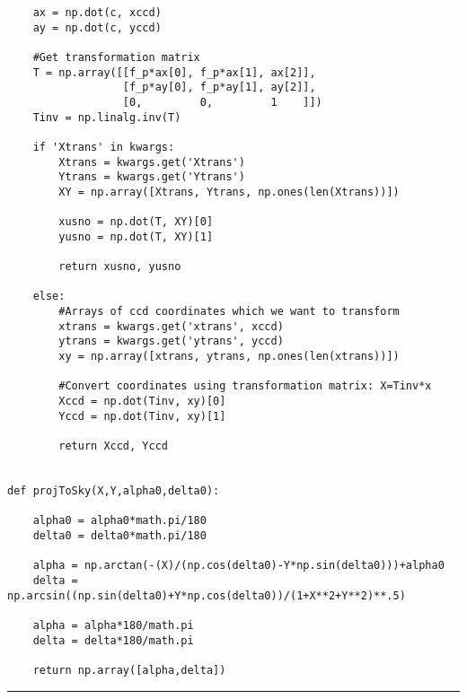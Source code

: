 \documentclass[preprint]{aastex62}
\begin{document}
\begin{lstlisting}
    ax = np.dot(c, xccd)
    ay = np.dot(c, yccd)

    #Get transformation matrix
    T = np.array([[f_p*ax[0], f_p*ax[1], ax[2]],
                  [f_p*ay[0], f_p*ay[1], ay[2]],
                  [0,         0,         1    ]])
    Tinv = np.linalg.inv(T)

    if 'Xtrans' in kwargs:
        Xtrans = kwargs.get('Xtrans')
        Ytrans = kwargs.get('Ytrans')
        XY = np.array([Xtrans, Ytrans, np.ones(len(Xtrans))])

        xusno = np.dot(T, XY)[0]
        yusno = np.dot(T, XY)[1]

        return xusno, yusno

    else:
        #Arrays of ccd coordinates which we want to transform
        xtrans = kwargs.get('xtrans', xccd)
        ytrans = kwargs.get('ytrans', yccd)
        xy = np.array([xtrans, ytrans, np.ones(len(xtrans))])

        #Convert coordinates using transformation matrix: X=Tinv*x
        Xccd = np.dot(Tinv, xy)[0]
        Yccd = np.dot(Tinv, xy)[1]

        return Xccd, Yccd


def projToSky(X,Y,alpha0,delta0):
    
    alpha0 = alpha0*math.pi/180
    delta0 = delta0*math.pi/180
    
    alpha = np.arctan(-(X)/(np.cos(delta0)-Y*np.sin(delta0)))+alpha0
    delta = np.arcsin((np.sin(delta0)+Y*np.cos(delta0))/(1+X**2+Y**2)**.5)
    
    alpha = alpha*180/math.pi
    delta = delta*180/math.pi
    
    return np.array([alpha,delta])
\end{lstlisting}
\hrule \vspace{7pt}
\end{document}
